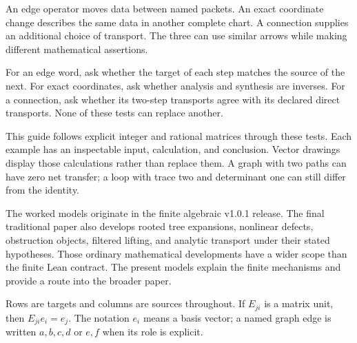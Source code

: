 An edge operator moves data between named packets. An exact coordinate change describes the same data in another complete chart. A connection supplies an additional choice of transport. The three can use similar arrows while making different mathematical assertions.


For an edge word, ask whether the target of each step matches the source of the next. For exact coordinates, ask whether analysis and synthesis are inverses. For a connection, ask whether its two-step transports agree with its declared direct transports. None of these tests can replace another.

This guide follows explicit integer and rational matrices through these tests. Each example has an inspectable input, calculation, and conclusion. Vector drawings display those calculations rather than replace them. A graph with two paths can have zero net transfer; a loop with trace two and determinant one can still differ from the identity.

The worked models originate in the finite algebraic v1.0.1 release. The final traditional paper also develops rooted tree expansions, nonlinear defects, obstruction objects, filtered lifting, and analytic transport under their stated hypotheses. Those ordinary mathematical developments have a wider scope than the finite Lean contract. The present models explain the finite mechanisms and provide a route into the broader paper.


Rows are targets and columns are sources throughout. If $E_{ji}$ is a matrix unit, then $E_{ji}e_i=e_j$. The notation $e_i$ means a basis vector; a named graph edge is written $a,b,c,d$ or $e,f$ when its role is explicit.

